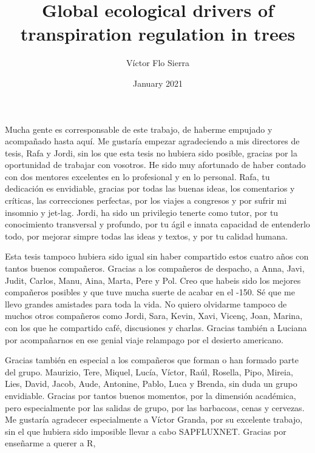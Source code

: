 \documentclass[11pt,twoside]{reedthesis}
\title{Global ecological drivers of transpiration regulation in trees}
\author{Víctor Flo Sierra}
\date{January 2021}
\begin{document}
  \maketitle

\frontmatter %
\pagestyle{empty} %
  \begin{acknowledgements}
    \setlength{\parindent}{30pt} Mucha gente es corresponsable de este
    trabajo, de haberme empujado y acompañado hasta aquí. Me gustaría
    empezar agradeciendo a mis directores de tesis, Rafa y Jordi, sin los
    que esta tesis no hubiera sido posible, gracias por la oportunidad de
    trabajar con vosotros. He sido muy afortunado de haber contado con dos
    mentores excelentes en lo profesional y en lo personal. Rafa, tu
    dedicación es envidiable, gracias por todas las buenas ideas, los
    comentarios y críticas, las correcciones perfectas, por los viajes a
    congresos y por sufrir mi insomnio y jet-lag. Jordi, ha sido un
    privilegio tenerte como tutor, por tu conocimiento transversal y
    profundo, por tu ágil e innata capacidad de entenderlo todo, por mejorar
    simpre todas las ideas y textos, y por tu calidad humana.\par
    Esta tesis tampoco hubiera sido igual sin haber compartido estos cuatro
    años con tantos buenos compañeros. Gracias a los compañeros de despacho,
    a Anna, Javi, Judit, Carlos, Manu, Aina, Marta, Pere y Pol. Creo que
    habeis sido los mejores compañeros posibles y que tuve mucha suerte de
    acabar en el -150. Sé que me llevo grandes amistades para toda la vida.
    No quiero olvidarme tampoco de muchos otros compañeros como Jordi, Sara,
    Kevin, Xavi, Vicenç, Joan, Marina, con los que he compartido café,
    discusiones y charlas. Gracias también a Luciana por acompañarnos en ese
    genial viaje relampago por el desierto americano.\par
    Gracias también en especial a los compañeros que forman o han formado
    parte del grupo. Maurizio, Tere, Miquel, Lucía, Víctor, Raúl, Rosella,
    Pipo, Mireia, Lies, David, Jacob, Aude, Antonine, Pablo, Luca y Brenda,
    sin duda un grupo envidiable. Gracias por tantos buenos momentos, por la
    dimensión académica, pero especialmente por las salidas de grupo, por
    las barbacoas, cenas y cervezas. Me gustaría agradecer especialmente a
    Víctor Granda, por su excelente trabajo, sin el que hubiera sido
    imposible llevar a cabo SAPFLUXNET. Gracias por enseñarme a querer a R,

\end{acknowledgements}
\end{document}
